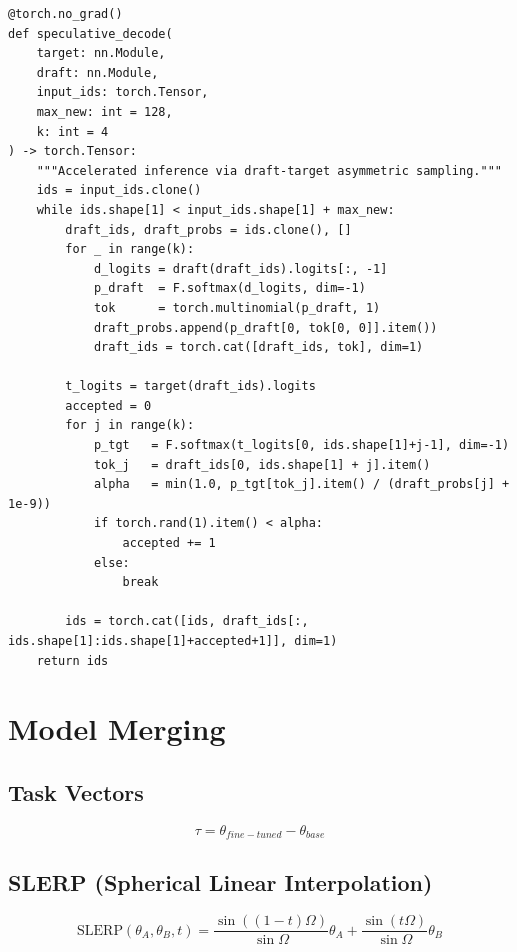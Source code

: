 \begin{lstlisting}[style=pythonstyle, caption={Speculative decoding loop}, label=lst:spec_dec]
@torch.no_grad()
def speculative_decode(
    target: nn.Module, 
    draft: nn.Module, 
    input_ids: torch.Tensor, 
    max_new: int = 128, 
    k: int = 4
) -> torch.Tensor:
    """Accelerated inference via draft-target asymmetric sampling."""
    ids = input_ids.clone()
    while ids.shape[1] < input_ids.shape[1] + max_new:
        draft_ids, draft_probs = ids.clone(), []
        for _ in range(k):
            d_logits = draft(draft_ids).logits[:, -1]
            p_draft  = F.softmax(d_logits, dim=-1)
            tok      = torch.multinomial(p_draft, 1)
            draft_probs.append(p_draft[0, tok[0, 0]].item())
            draft_ids = torch.cat([draft_ids, tok], dim=1)

        t_logits = target(draft_ids).logits
        accepted = 0
        for j in range(k):
            p_tgt   = F.softmax(t_logits[0, ids.shape[1]+j-1], dim=-1)
            tok_j   = draft_ids[0, ids.shape[1] + j].item()
            alpha   = min(1.0, p_tgt[tok_j].item() / (draft_probs[j] + 1e-9))
            if torch.rand(1).item() < alpha:
                accepted += 1
            else:
                break
        
        ids = torch.cat([ids, draft_ids[:, ids.shape[1]:ids.shape[1]+accepted+1]], dim=1)
    return ids
\end{lstlisting}

\section{Model Merging}
\label{app:merging}

\subsection{Task Vectors}
\label{form:task_vec}

\[
  \tau = \theta_{fine-tuned} - \theta_{base}
\]

\subsection{SLERP (Spherical Linear Interpolation)}
\label{form:slerp}

\[
  \mathrm{SLERP}(\theta_A, \theta_B, t) = \frac{\sin((1-t)\Omega)}{\sin\Omega}\theta_A + \frac{\sin(t\Omega)}{\sin\Omega}\theta_B
\]

